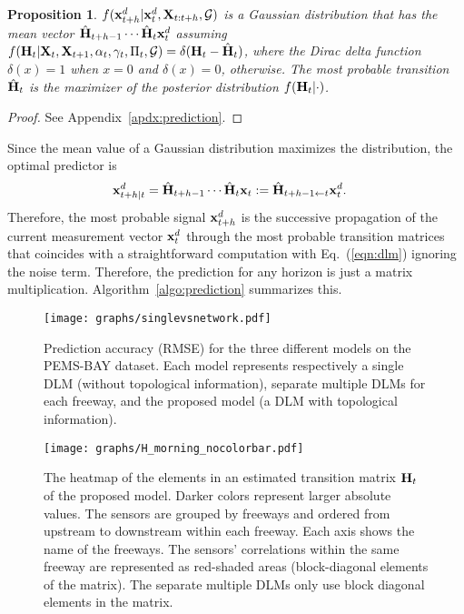 \documentclass[journal]{IEEEtran}
\newtheorem{prop}{Proposition}
\begin{document}
\begin{prop}\label{prop:1}
$f({\bf{x}}^d_{t+h}|{\bf{x}}^d_t,{\bf{X}}_{t:t+h},\mathcal{G})$ is a Gaussian distribution that has the mean vector $\hat {\bf{H}}_{t+h-1}\cdots\hat {\bf{H}}_t{\bf{x}}^d_t$ assuming $f({\bf{H}}_t|{\bf{X}}_{t},{\bf{X}}_{t+1},\alpha_t,\gamma_t,\Pi_t,\mathcal{G})=\delta({\bf{H}}_t-\hat {\bf{H}}_t)$, where the Dirac delta function $\delta(x)=1$ when $x=0$ and $\delta(x)=0$, otherwise. The most probable transition $\hat{\bf{H}}_t$ is the maximizer of the posterior distribution $f({\bf{H}}_t|\cdot)$.
\end{prop}
\begin{proof}
See Appendix~\ref{apdx:prediction}.
\end{proof}
Since the mean value of a Gaussian distribution maximizes the distribution, the optimal predictor is
\begin{equation}\label{eqn:pred_proposed}
    \begin{aligned}
        {\bf{x}}^d_{t+h|t}&=\hat {\bf{H}}_{t+h-1}\cdots\hat {\bf{H}}_t{\bf{x}}_t
        :=\hat {\bf{H}}_{t+h-1\leftarrow t}{\bf{x}}^d_t.
    \end{aligned}
\end{equation}
Therefore, the most probable signal ${\bf{x}}_{t+h}^d$ is the successive propagation of the current measurement vector ${\bf{x}}_t^d$ through the most probable transition matrices 
that coincides with a straightforward computation with Eq.~(\ref{eqn:dlm}) ignoring the noise term. Therefore, the prediction for any horizon is just a matrix multiplication.
Algorithm~\ref{algo:prediction} summarizes this.

\begin{figure}[!t]
   \centering
   {\texttt{[image: graphs/singlevsnetwork.pdf]}}
   \caption{Prediction accuracy (RMSE) for the three different models on the PEMS-BAY dataset. Each model represents respectively a single DLM (without topological information), separate multiple DLMs for each freeway, and the proposed model (a DLM with topological information).}\label{fig:single_vs_network}
\end{figure}
\begin{figure}[!t]
   \centering
   {\texttt{[image: graphs/H\_morning\_nocolorbar.pdf]}}
   \caption{The heatmap of the elements in an estimated transition matrix ${\bf{H}}_t$ of the proposed model.
   Darker colors represent larger absolute values.
   The sensors are grouped by freeways and ordered from upstream to downstream within each freeway. Each axis shows the name of the freeways. The sensors' correlations within the same freeway are represented as red-shaded areas (block-diagonal elements of the matrix). The separate multiple DLMs only use block diagonal elements in the matrix.
   }
   \label{fig:h_morning}
\end{figure}
\end{document}
